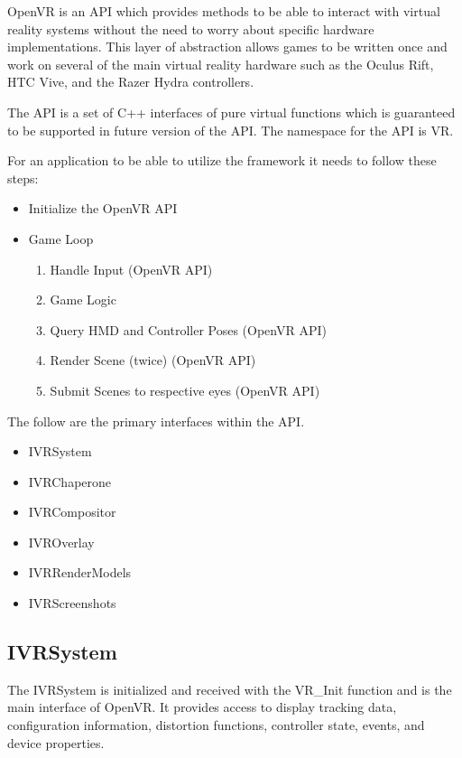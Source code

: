 \documentclass[journal]{IEEEtran}
\begin{document}
OpenVR is an API which provides methods to be able to interact with virtual reality systems without the need to worry about specific hardware implementations. This layer of abstraction allows games to be written once and work on several of the main virtual reality hardware such as the Oculus Rift, HTC Vive, and the Razer Hydra controllers. 

The API is a set of C++ interfaces of pure virtual functions which is guaranteed to be supported in future version of the API. The namespace for the API is VR. 

For an application to be able to utilize the framework it needs to follow these steps:\newline
\begin{itemize}
	\item Initialize the OpenVR API
	\item Game Loop
	\begin{enumerate}
	\item Handle Input (OpenVR API)
	\item Game Logic
	\item Query HMD and Controller Poses (OpenVR API)
	\item Render Scene (twice) (OpenVR API)
	\item Submit Scenes to respective eyes (OpenVR API)\newline
	\end{enumerate}
\end{itemize}


The follow are the primary interfaces within the API.

\begin{itemize}
\item IVRSystem
\item IVRChaperone
\item IVRCompositor
\item IVROverlay
\item IVRRenderModels
\item IVRScreenshots
\end{itemize}


\subsection{IVRSystem}

The IVRSystem is initialized and received with the VR\_Init function and is the main interface of OpenVR. It provides access to display  tracking data, configuration information, distortion functions, controller state, events, and device properties. 
\end{document}
